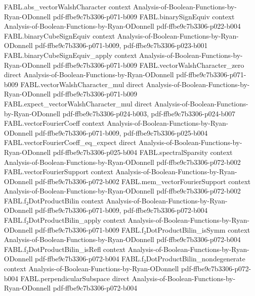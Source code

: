 \begin{theorem}
\proofstep
  {FABL.abs_vectorWalshCharacter}
  {context}
  {Analysis-of-Boolean-Functions-by-Ryan-ODonnell}
  {pdf-ffbe9c7b3306-p071-b009}
\proofstep
  {FABL.binarySignEquiv}
  {context}
  {Analysis-of-Boolean-Functions-by-Ryan-ODonnell}
  {pdf-ffbe9c7b3306-p022-b004}
\proofstep
  {FABL.binaryCubeSignEquiv}
  {context}
  {Analysis-of-Boolean-Functions-by-Ryan-ODonnell}
  {pdf-ffbe9c7b3306-p071-b009,
    pdf-ffbe9c7b3306-p023-b001}
\proofstep
  {FABL.binaryCubeSignEquiv_apply}
  {context}
  {Analysis-of-Boolean-Functions-by-Ryan-ODonnell}
  {pdf-ffbe9c7b3306-p071-b009}
\proofstep
  {FABL.vectorWalshCharacter_zero}
  {direct}
  {Analysis-of-Boolean-Functions-by-Ryan-ODonnell}
  {pdf-ffbe9c7b3306-p071-b009}
\proofstep
  {FABL.vectorWalshCharacter_mul}
  {direct}
  {Analysis-of-Boolean-Functions-by-Ryan-ODonnell}
  {pdf-ffbe9c7b3306-p071-b009}
\proofstep
  {FABL.expect_vectorWalshCharacter_mul}
  {direct}
  {Analysis-of-Boolean-Functions-by-Ryan-ODonnell}
  {pdf-ffbe9c7b3306-p024-b003,
    pdf-ffbe9c7b3306-p024-b007}
\proofstep
  {FABL.vectorFourierCoeff}
  {context}
  {Analysis-of-Boolean-Functions-by-Ryan-ODonnell}
  {pdf-ffbe9c7b3306-p071-b009,
    pdf-ffbe9c7b3306-p025-b004}
\proofstep
  {FABL.vectorFourierCoeff_eq_expect}
  {direct}
  {Analysis-of-Boolean-Functions-by-Ryan-ODonnell}
  {pdf-ffbe9c7b3306-p025-b004}
\proofstep
  {FABL.spectralSparsity}
  {context}
  {Analysis-of-Boolean-Functions-by-Ryan-ODonnell}
  {pdf-ffbe9c7b3306-p072-b002}
\proofstep
  {FABL.vectorFourierSupport}
  {context}
  {Analysis-of-Boolean-Functions-by-Ryan-ODonnell}
  {pdf-ffbe9c7b3306-p072-b002}
\proofstep
  {FABL.mem_vectorFourierSupport}
  {context}
  {Analysis-of-Boolean-Functions-by-Ryan-ODonnell}
  {pdf-ffbe9c7b3306-p072-b002}
\proofstep
  {FABL.f₂DotProductBilin}
  {context}
  {Analysis-of-Boolean-Functions-by-Ryan-ODonnell}
  {pdf-ffbe9c7b3306-p071-b009,
    pdf-ffbe9c7b3306-p072-b004}
\proofstep
  {FABL.f₂DotProductBilin_apply}
  {context}
  {Analysis-of-Boolean-Functions-by-Ryan-ODonnell}
  {pdf-ffbe9c7b3306-p071-b009}
\proofstep
  {FABL.f₂DotProductBilin_isSymm}
  {context}
  {Analysis-of-Boolean-Functions-by-Ryan-ODonnell}
  {pdf-ffbe9c7b3306-p072-b004}
\proofstep
  {FABL.f₂DotProductBilin_isRefl}
  {context}
  {Analysis-of-Boolean-Functions-by-Ryan-ODonnell}
  {pdf-ffbe9c7b3306-p072-b004}
\proofstep
  {FABL.f₂DotProductBilin_nondegenerate}
  {context}
  {Analysis-of-Boolean-Functions-by-Ryan-ODonnell}
  {pdf-ffbe9c7b3306-p072-b004}
\proofstep
  {FABL.perpendicularSubspace}
  {direct}
  {Analysis-of-Boolean-Functions-by-Ryan-ODonnell}
  {pdf-ffbe9c7b3306-p072-b004}

\end{theorem}
